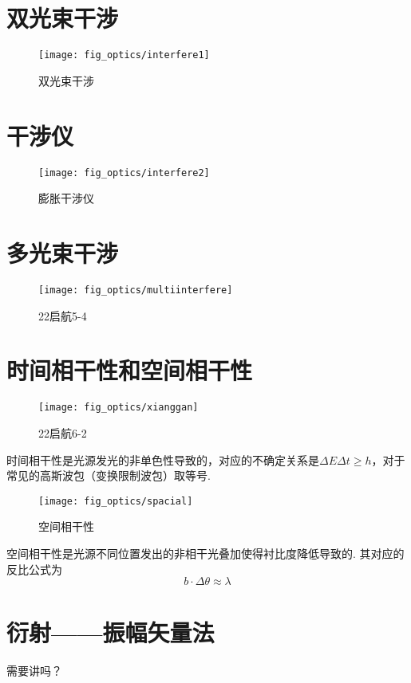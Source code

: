 \documentclass[a4paper]{article}
\begin{document}
	\section{双光束干涉}
	\begin{figure}[H]
		\centering
		\texttt{[image: fig\_optics/interfere1]}
		\caption{双光束干涉}
		\label{fig:interfere1}
	\end{figure}
	
	\section{干涉仪}
	\begin{framed}
		\begin{figure}[H]
			\centering
			\texttt{[image: fig\_optics/interfere2]}
			\caption{膨胀干涉仪}
			\label{fig:interfere2}
		\end{figure}
	\end{framed} 
	
	\section{多光束干涉}
	\begin{figure}[H]
		\centering
		\texttt{[image: fig\_optics/multiinterfere]}
		\caption{22启航5-4}
		\label{fig:multiinterfere}
	\end{figure}
	
	
	\section{时间相干性和空间相干性}
	\begin{figure}[H]
		\centering
		\texttt{[image: fig\_optics/xianggan]}
		\caption{22启航6-2}
		\label{fig:xianggan}
	\end{figure}
	
	时间相干性是光源发光的非单色性导致的，对应的不确定关系是$\Delta E \Delta t \ge h$，对于常见的高斯波包（变换限制波包）取等号. 
	

	\begin{figure}[H]
		\centering
		\texttt{[image: fig\_optics/spacial]}
		\caption{空间相干性}
		\label{fig:spacial}
	\end{figure}
	
	空间相干性是光源不同位置发出的非相干光叠加使得衬比度降低导致的. 其对应的反比公式为$$b\cdot \Delta \theta \approx \lambda$$
	
	\section{衍射——振幅矢量法}
	\begin{framed}
		需要讲吗？
	\end{framed}
	
\end{document}
